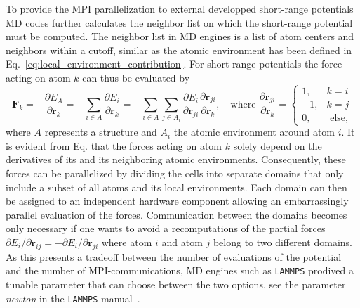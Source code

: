 To provide the MPI parallelization to external developped short-range potentials MD codes further calculates the neighbor list on which the short-range potential must be computed.
The neighbor list in MD engines is a list of atom centers and neighbors within a cutoff, similar as the atomic environment has been defined in Eq.~\eqref{eq:local_environment_contribution}.
For short-range potentials the force acting on atom $k$ can thus be evaluated by 
\begin{equation}
  \label{eq:forces_interatomic_potential}
  \mathbf{F}_k =  -\frac{\partial E_A}{\partial\mathbf{r}_k}
  = -\sum_{i\in A} \frac{\partial E_i}{\partial\mathbf{r}_k}
  = -\sum_{i\in A}\sum_{j\in A_i} \frac{\partial E_i}{\partial\mathbf{r}_{ji}} \frac{\partial\mathbf{r}_{ji}}{\partial\mathbf{r}_k}
   ,\quad\textrm{where }\frac{\partial\mathbf{r}_{ji}}{\partial\mathbf{r}_k} = \begin{cases}1,& k=i \\ -1,& k=j \\0,& \textrm{ else,} \end{cases}
\end{equation}
where $A$ represents a structure and $A_i$ the atomic environment around atom $i$.
It is evident from Eq. that the forces acting on atom $k$ solely depend on the derivatives of its and its neighboring atomic environments.
Consequently, these forces can be parallelized by dividing the cells into separate domains that only include a subset of all atoms and its local environments.
Each domain can then be assigned to an independent hardware component allowing an embarrassingly parallel evaluation of the forces.
Communication between the domains becomes only necessary if one wants to avoid a recomputations of the partial forces $\partial E_i/\partial\mathbf{r}_{ij}=-\partial E_i/\partial\mathbf{r}_{ji}$ where atom $i$ and atom $j$ belong to two different domains.
As this presents a tradeoff between the number of evaluations of the potential and the number of MPI-communications, MD engines such as \texttt{LAMMPS} prodived a tunable parameter that can choose between the two options, see the parameter \emph{newton} in the \texttt{LAMMPS} manual~\cite{lammpsnewton}.
